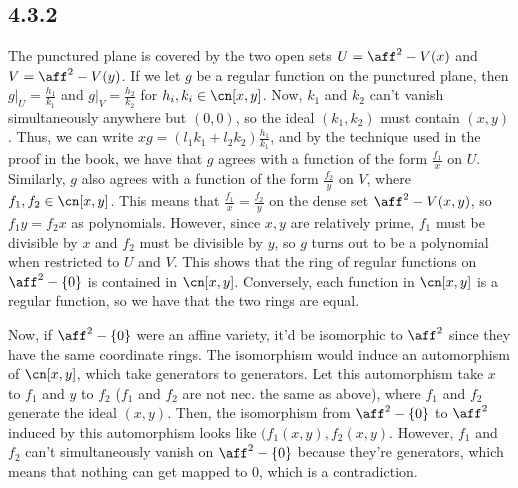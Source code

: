 \documentclass{article}
\begin{document}
\subsection*{4.3.2}
The punctured plane is covered by the two open sets $U=\aff^2-V(x)$ and $V=\aff^2-V(y)$. If we let $g$ be a regular function on the punctured plane, then $g|_U=\frac{h_1}{k_1}$ and $g|_V=\frac{h_2}{k_2}$ for $h_i,k_i\in\cn[x,y]$. Now, $k_1$ and $k_2$ can't vanish simultaneously anywhere but $(0,0)$, so the ideal $(k_1,k_2)$ must contain $(x,y)$. Thus, we can write $xg=(l_1k_1+l_2k_2)\frac{h_1}{k_1}$, and by the technique used in the proof in the book, we have that $g$ agrees with a function of the form $\frac{f_1}{x}$ on $U$. Similarly, $g$ also agrees with a function of the form $\frac{f_2}{y}$ on $V$, where $f_1,f_2\in\cn[x,y]$. This means that $\frac{f_1}{x}=\frac{f_2}{y}$ on the dense set $\aff^2-V(x,y)$, so $f_1y=f_2x$ as polynomials. However, since $x,y$ are relatively prime, $f_1$ must be divisible by $x$ and $f_2$ must be divisible by $y$, so $g$ turns out to be a polynomial when restricted to $U$ and $V$. This shows that the ring of regular functions on $\aff^2-\{0\}$ is contained in $\cn[x,y]$. Conversely, each function in $\cn[x,y]$ is a regular function, so we have that the two rings are equal. 

Now, if $\aff^2-\{0\}$ were an affine variety, it'd be isomorphic to $\aff^2$ since they have the same coordinate rings. The isomorphism would induce an automorphism of $\cn[x,y]$, which take generators to generators. Let this automorphism take $x$ to $f_1$ and $y$ to $f_2$ ($f_1$ and $f_2$ are not nec. the same as above), where $f_1$ and $f_2$ generate the ideal $(x,y)$. Then, the isomorphism from $\aff^2-\{0\}$ to $\aff^2$ induced by this automorphism looks like $(f_1(x,y),f_2(x,y)$. However, $f_1$ and $f_2$ can't simultaneously vanish on $\aff^2-\{0\}$ because they're generators, which means that nothing can get mapped to $0$, which is a contradiction.
\end{document}
